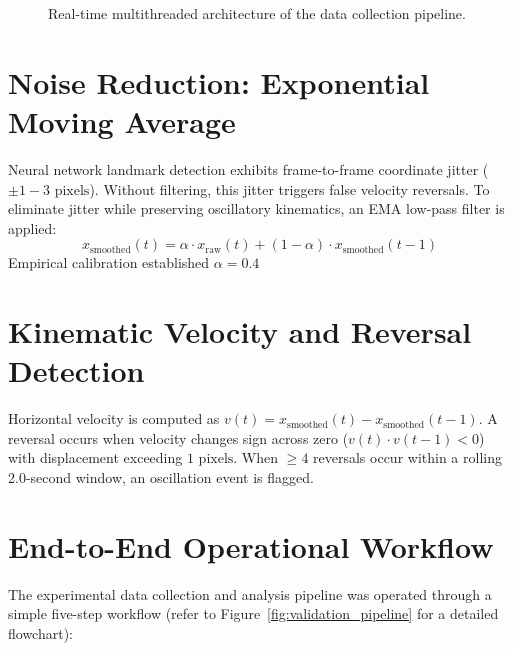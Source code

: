 \documentclass[12pt,a4paper,oneside]{report}
\begin{document}
\begin{figure}[htbp]
\caption{Real-time multithreaded architecture of the data collection pipeline.}
\label{fig:architecture}
\end{figure}

\section{Noise Reduction: Exponential Moving Average}
Neural network landmark detection exhibits frame-to-frame coordinate jitter ($\pm 1 - 3\text{ pixels}$). Without filtering, this jitter triggers false velocity reversals. To eliminate jitter while preserving oscillatory kinematics, an EMA low-pass filter is applied:
\begin{equation}
    x_{\text{smoothed}}(t) = \alpha \cdot x_{\text{raw}}(t) + (1 - \alpha) \cdot x_{\text{smoothed}}(t-1)
\end{equation}
Empirical calibration established $\alpha = 0.4$

\section{Kinematic Velocity and Reversal Detection}
Horizontal velocity is computed as $v(t) = x_{\text{smoothed}}(t) - x_{\text{smoothed}}(t-1)$. A reversal occurs when velocity changes sign across zero ($v(t) \cdot v(t-1) < 0$) with displacement exceeding $1\text{ pixels}$. When $\ge 4$ reversals occur within a rolling 2.0-second window, an oscillation event is flagged.


\section{End-to-End Operational Workflow}
The experimental data collection and analysis pipeline was operated through a simple five-step workflow (refer to Figure~\ref{fig:validation_pipeline} for a detailed flowchart):
\end{document}

